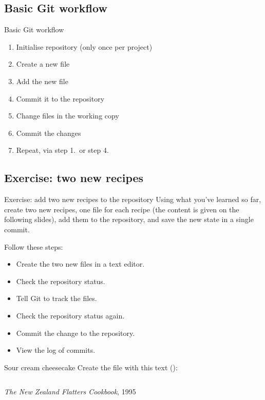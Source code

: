 \subsection{Basic Git workflow}

\begin{frame}[fragile]{Basic Git workflow}
    \begin{enumerate}
        \item[0.] Initialise repository (only once per project)
        \item Create a new file
        \item Add the new file
        \item Commit it to the repository
        \item Change files in the working copy
        \item Commit the changes
        \item Repeat, via step 1.\ or step 4.
    \end{enumerate}
\end{frame}

\subsection{Exercise: two new recipes}

\begin{frame}[fragile]{Exercise: add two new recipes to the repository}
    Using what you've learned so far, create two new recipes, one file for
    each recipe (the content is given on the following slides), add them to
    the repository, and save the new state in a single commit.

    Follow these steps:
    \begin{itemize}
        \item Create the two new files in a text editor.
        \item Check the repository status.
        \item Tell Git to track the files.
        \item Check the repository status again.
        \item Commit the change to the repository.
        \item View the log of commits.
    \end{itemize}
\end{frame}

\begin{frame}{Sour cream cheesecake}
    Create the file  with this text
    (\href{https://raw.githubusercontent.com/paultcochrane/git_course/refs/heads/master/git/examples/flatters-sour-cream-cheesecake.md}{}):
    \inputminted[fontsize={\fontsize{5}{6}\selectfont}]{markdown}{examples/flatters-sour-cream-cheesecake.md}
    {\footnotesize \emph{The New Zealand Flatters Cookbook}, 1995}
\end{frame}

